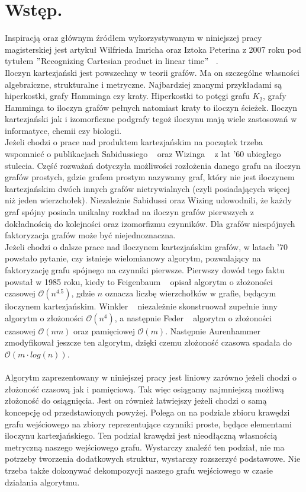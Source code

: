 \documentclass[12pt,a4paper,titlepage]{article}
\newcommand\tab[1][1cm]{\hspace*{#1}}
\begin{document}
\section*{Wstęp.}
Inspiracją oraz głównym źródłem wykorzystywanym w niniejszej pracy magisterskiej jest artykuł Wilfrieda Imricha oraz Iztoka Peterina z 2007 roku pod tytułem $"$Recognizing Cartesian product in linear time$"$ ~\cite{MAIN}. \\

Iloczyn kartezjański jest powszechny w teorii grafów. Ma on szczególne własności algebraiczne, strukturalne i metryczne. Najbardziej znanymi przykładami są hiperkostki, grafy Hamminga czy kraty. Hiperkostki to potęgi grafu $K_2$, grafy Hamminga to iloczyn grafów pełnych natomiast kraty to iloczyn ścieżek. Iloczyn kartezjański jak i izomorficzne podgrafy tegoż iloczynu mają wiele zastosowań w informatyce, chemii czy biologii.\\
\tab[0.6cm]Jeżeli chodzi o prace nad produktem kartezjańskim na początek trzeba wspomnieć o publikacjach Sabidussiego ~\cite{SAB} oraz Wizinga ~\cite{VIS} z lat '60 ubiegłego stulecia. Część rozważań dotyczyła możliwości rozłożenia danego grafu na iloczyn grafów prostych, gdzie grafem prostym nazywamy graf, który nie jest iloczynem kartezjańskim dwóch innych grafów nietrywialnych (czyli posiadających więcej niż jeden wierzchołek). Niezależnie Sabidussi oraz Wizing udowodnili, że każdy graf spójny posiada unikalny rozkład na iloczyn grafów pierwszych z dokładnością do kolejności oraz izomorfizmu czynników. Dla grafów niespójnych faktoryzacja grafów może być niejednoznaczna.\\
\tab[0.6cm]Jeżeli chodzi o dalsze prace nad iloczynem kartezjańskim grafów, w latach '70 powstało pytanie, czy istnieje wielomianowy algorytm, pozwalający na faktoryzację grafu spójnego na czynniki pierwsze. Pierwszy dowód tego faktu powstał w 1985 roku, kiedy to Feigenbaum ~\cite{FEI} opisał algorytm o złożoności czasowej $\mathcal{O} (n^{4.5})$, gdzie $n$ oznacza liczbę wierzchołków w grafie, będącym iloczynem kartezjańskim. Winkler ~\cite{WIN} niezależnie skonstruował zupełnie inny algorytm o złożoności $\mathcal{O} (n^{4})$, a następnie Feder ~\cite{FED} algorytm o złożoności czasowej $\mathcal{O} (nm)$ oraz pamięciowej $\mathcal{O} (m)$. Następnie Aurenhammer ~\cite{AUR} zmodyfikował jeszcze ten algorytm, dzięki czemu złożoność czasowa spadała do $\mathcal{O} (m\cdot log (n))$.\\
\\
\tab[0.6cm]Algorytm zaprezentowany w niniejszej pracy jest liniowy zarówno jeżeli chodzi o złożoność czasową jak i pamięciową. Tak więc osiągamy najmniejszą możliwą złożoność do osiągnięcia. Jest on również łatwiejszy jeżeli chodzi o samą koncepcję od przedstawionych powyżej. Polega on na podziale zbioru krawędzi grafu wejściowego na zbiory reprezentujące czynniki proste, będące elementami iloczynu kartezjańskiego. Ten podział krawędzi jest nieodłączną własnością metryczną naszego wejściowego grafu. Wystarczy znaleźć ten podział, nie ma potrzeby tworzenia dodatkowych struktur, wystarczy rozszerzyć podstawowe. Nie trzeba także dokonywać dekompozycji naszego grafu wejściowego w czasie działania algorytmu. \\
\end{document}
